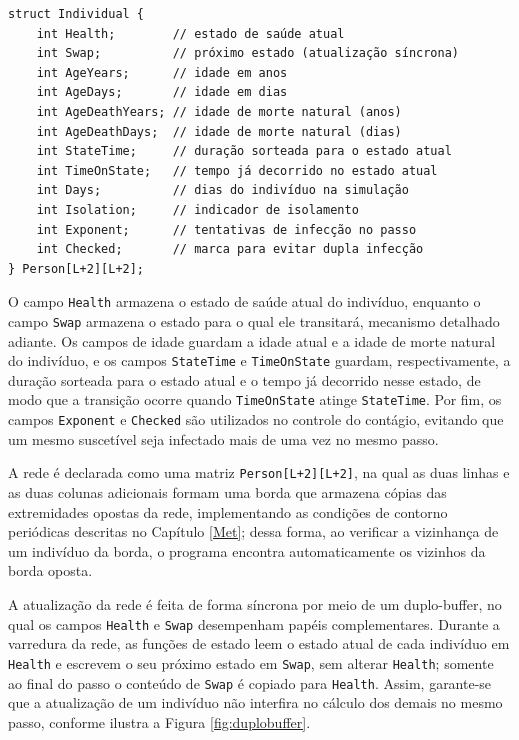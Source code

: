 \documentclass[
	12pt,				%
	openright,			%
	oneside,			%
	a4paper,			%
	english,			%
	french,				%
	spanish,			%
	brazil				%
	]{abntex2}
\begin{document}
\begin{lstlisting}[caption={Estrutura que representa cada indivíduo (agente).}, label={lst:struct}]
struct Individual {
    int Health;        // estado de saúde atual
    int Swap;          // próximo estado (atualização síncrona)
    int AgeYears;      // idade em anos
    int AgeDays;       // idade em dias
    int AgeDeathYears; // idade de morte natural (anos)
    int AgeDeathDays;  // idade de morte natural (dias)
    int StateTime;     // duração sorteada para o estado atual
    int TimeOnState;   // tempo já decorrido no estado atual
    int Days;          // dias do indivíduo na simulação
    int Isolation;     // indicador de isolamento
    int Exponent;      // tentativas de infecção no passo
    int Checked;       // marca para evitar dupla infecção
} Person[L+2][L+2];
\end{lstlisting}

O campo \texttt{Health} armazena o estado de saúde atual do indivíduo, enquanto o campo \texttt{Swap} armazena o estado para o qual ele transitará, mecanismo detalhado adiante. Os campos de idade guardam a idade atual e a idade de morte natural do indivíduo, e os campos \texttt{StateTime} e \texttt{TimeOnState} guardam, respectivamente, a duração sorteada para o estado atual e o tempo já decorrido nesse estado, de modo que a transição ocorre quando \texttt{TimeOnState} atinge \texttt{StateTime}. Por fim, os campos \texttt{Exponent} e \texttt{Checked} são utilizados no controle do contágio, evitando que um mesmo suscetível seja infectado mais de uma vez no mesmo passo.

A rede é declarada como uma matriz \texttt{Person[L+2][L+2]}, na qual as duas linhas e as duas colunas adicionais formam uma borda que armazena cópias das extremidades opostas da rede, implementando as condições de contorno periódicas descritas no Capítulo \ref{Met}; dessa forma, ao verificar a vizinhança de um indivíduo da borda, o programa encontra automaticamente os vizinhos da borda oposta.

A atualização da rede é feita de forma síncrona por meio de um duplo-buffer, no qual os campos \texttt{Health} e \texttt{Swap} desempenham papéis complementares. Durante a varredura da rede, as funções de estado leem o estado atual de cada indivíduo em \texttt{Health} e escrevem o seu próximo estado em \texttt{Swap}, sem alterar \texttt{Health}; somente ao final do passo o conteúdo de \texttt{Swap} é copiado para \texttt{Health}. Assim, garante-se que a atualização de um indivíduo não interfira no cálculo dos demais no mesmo passo, conforme ilustra a Figura \ref{fig:duplobuffer}.
\end{document}
